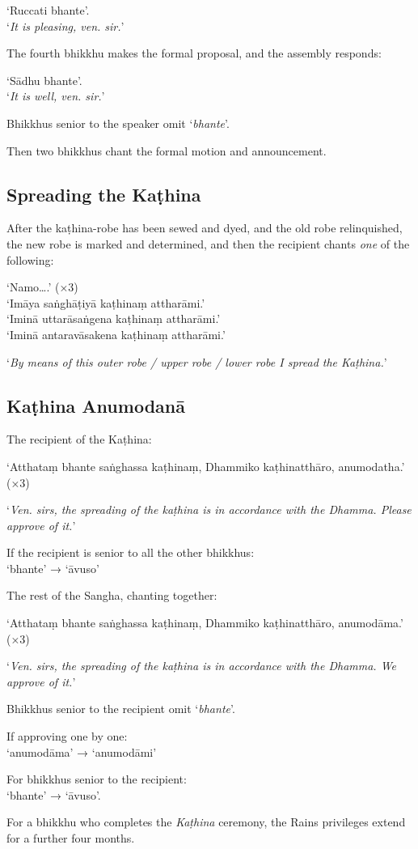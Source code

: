 ‘Ruccati bhante’.\\
‘\emph{It is pleasing, ven. sir.}’

The fourth bhikkhu makes the formal proposal, and the assembly responds:

‘Sādhu bhante’.\\
‘\emph{It is well, ven. sir.}’

Bhikkhus senior to the speaker omit ‘\emph{bhante}’.

Then two bhikkhus chant the formal motion and announcement.


\subsection{Spreading the Kaṭhina}

After the kaṭhina-robe has been sewed and dyed, and the old robe relinquished,
the new robe is marked and determined, and then the recipient chants \emph{one}
of the following:

‘Namo….’ (×3)\\
‘Imāya saṅghāṭiyā kaṭhinaṃ attharāmi.’\\
‘Iminā uttarāsaṅgena kaṭhinaṃ attharāmi.’\\
‘Iminā antaravāsakena kaṭhinaṃ attharāmi.’

‘\emph{By means of this outer robe / upper robe / lower robe I spread the Kaṭhina.}’


\clearpage

\subsection{Kaṭhina Anumodanā}

The recipient of the Kaṭhina:

‘Atthataṃ bhante saṅghassa kaṭhinaṃ, Dhammiko kaṭhinatthāro, anumodatha.’ (×3)

‘\emph{Ven. sirs, the spreading of the kaṭhina is in accordance with the Dhamma.
  Please approve of it.}’

If the recipient is senior to all the other bhikkhus:\\
‘bhante’ → ‘āvuso’

The rest of the Sangha, chanting together:

‘Atthataṃ bhante saṅghassa kaṭhinaṃ, Dhammiko kaṭhinatthāro, anumodāma.’ (×3)

‘\emph{Ven. sirs, the spreading of the kaṭhina is in accordance with the Dhamma.
  We approve of it.}’


Bhikkhus senior to the recipient omit ‘\emph{bhante}’.

If approving one by one:\\
‘anumodāma’ → ‘anumodāmi’

For bhikkhus senior to the recipient:\\
‘bhante’ → ‘āvuso’.

For a bhikkhu who completes the \emph{Kaṭhina} ceremony, the Rains privileges
extend for a further four months.


